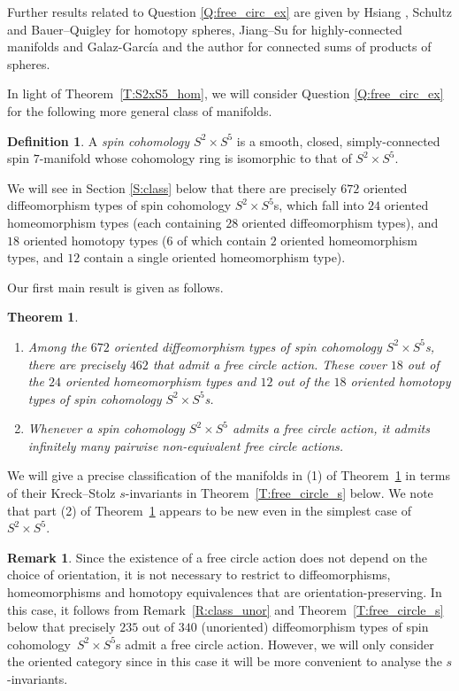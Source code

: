 \documentclass[10pt,a4paper]{amsart}
\numberwithin{equation}{section}
\newtheorem{theoremAlph}{Theorem}
\theoremstyle{definition}
\newtheorem{Definition}[Theorem]{Definition}
\newtheorem{Remark}[Theorem]{Remark}
\numberwithin{table}{section}
\begin{document}
Further results related to Question \ref{Q:free_circ_ex} are given by Hsiang \cite{Hs66}, Schultz \cite{Sc71} and Bauer--Quigley \cite{BQ26} for homotopy spheres, Jiang--Su \cite{JS25} for highly-connected manifolds and Galaz-García and the author \cite{GR25} for connected sums of products of spheres.

In light of Theorem~\ref{T:S2xS5_hom}, we will consider Question \ref{Q:free_circ_ex} for the following more general class of manifolds.	
\begin{Definition}
	A \emph{spin cohomology $S^2\times S^5$} is a smooth, closed, simply-connected spin $7$-mani\-fold whose cohomology ring is isomorphic to that of $S^2\times S^5$.
\end{Definition}

We will see in Section \ref{S:class} below that there are precisely $672$ oriented diffeomorphism types of spin cohomology $S^2\times S^5$s, which fall into $24$ oriented homeomorphism types (each containing $28$ oriented diffeomorphism types), and $18$ oriented homotopy types ($6$ of which contain $2$ oriented homeomorphism types, and $12$ contain a single oriented homeomorphism type).

Our first main result is given as follows.
\begin{theoremAlph}\label{T:free_circle}\qquad
	\begin{enumerate}\itemsep=0pt
		\item[$(1)$] Among the $672$ oriented diffeomorphism types of spin cohomology $S^2\times S^5$s, there are precisely $462$ that admit a free circle action. These cover $18$ out of the $24$ oriented homeomorphism types and $12$ out of the $18$ oriented homotopy types of spin cohomology $S^2\times S^5$s.
		\item[$(2)$] Whenever a spin cohomology $S^2\times S^5$ admits a free circle action, it admits infinitely many pairwise non-equivalent free circle actions.
	\end{enumerate}
\end{theoremAlph}

We will give a precise classification of the manifolds in (1) of Theorem~\ref{T:free_circle} in terms of their Kreck--Stolz $s$-invariants in Theorem~\ref{T:free_circle_s} below. We note that part (2) of Theorem~\ref{T:free_circle} appears to be new even in the simplest case of $S^2\times S^5$.

\begin{Remark}
	Since the existence of a free circle action does not depend on the choice of orientation, it is not necessary to restrict to diffeomorphisms, homeomorphisms and homotopy equivalences that are orientation-preserving. In this case, it follows from Remark~\ref{R:class_unor} and Theorem~\ref{T:free_circle_s} below that precisely $235$ out of $340$ (unoriented) diffeomorphism types of spin cohomology~${S^2\times S^5}$s admit a free circle action. However, we will only consider the oriented category since in this case it will be more convenient to analyse the $s$-invariants.
\end{Remark}
\end{document}
